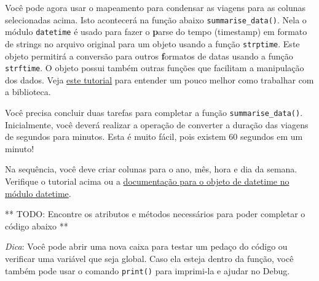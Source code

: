 \documentclass[11pt]{article}
\begin{document}
    Você pode agora usar o mapeamento para condensar as viagens para as
colunas selecionadas acima. Isto acontecerá na função abaixo
\texttt{summarise\_data()}. Nela o módulo \texttt{datetime} é usado para
fazer o \textbf{p}arse do tempo (timestamp) em formato de strings no
arquivo original para um objeto usando a função \texttt{strptime}. Este
objeto permitirá a conversão para outros \textbf{f}ormatos de datas
usando a função \texttt{strftime}. O objeto possui também outras funções
que facilitam a manipulação dos dados. Veja
\href{http://usandopython.com.br/manipulando-data-hora-python-datetime/}{este
tutorial} para entender um pouco melhor como trabalhar com a biblioteca.

Você precisa concluir duas tarefas para completar a função
\texttt{summarise\_data()}. Inicialmente, você deverá realizar a
operação de converter a duração das viagens de segundos para minutos.
Esta é muito fácil, pois existem 60 segundos em um minuto!

Na sequência, você deve criar colunas para o ano, mês, hora e dia da
semana. Verifique o tutorial acima ou a
\href{https://docs.python.org/2/library/datetime.html\#datetime-objects}{documentação
para o objeto de datetime no módulo datetime}.

** TODO: Encontre os atributos e métodos necessários para poder
completar o código abaixo **

\emph{Dica}: Você pode abrir uma nova caixa para testar um pedaço do
código ou verificar uma variável que seja global. Caso ela esteja dentro
da função, você também pode usar o comando \texttt{print()} para
imprimi-la e ajudar no Debug.
\end{document}
